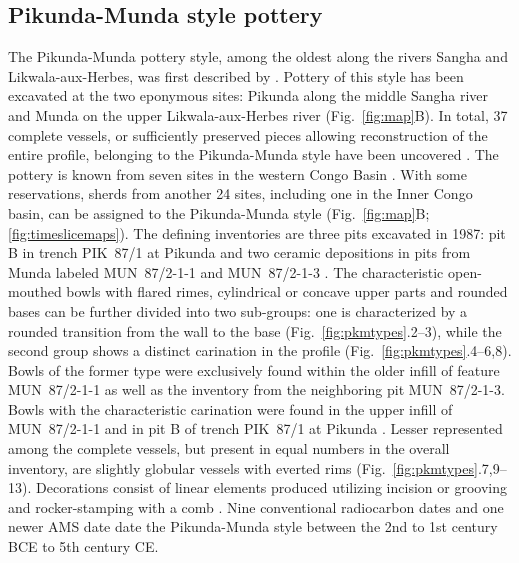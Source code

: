 \documentclass[smallextended,natbib]{svjour3}       %
\begin{document}
\subsection{Pikunda-Munda style pottery}

The Pikunda-Munda pottery style, among the oldest along the rivers Sangha and Likwala-aux-Herbes, was first described by \citet{Eggert.1992}. Pottery of this style has been excavated at the two eponymous sites: Pikunda along the middle Sangha river and Munda on the upper Likwala-aux-Herbes river (Fig.~\ref{fig:map}B). In total, 37 complete vessels, or sufficiently preserved pieces allowing reconstruction of the entire profile, belonging to the Pikunda-Munda style have been uncovered \citep[114--115]{Seidensticker.2021e}. The pottery is known from seven sites in the western Congo Basin \citep[119--120 Fig.~49]{Seidensticker.2021e}. With some reservations, sherds from another 24 sites, including one in the Inner Congo basin, can be assigned to the Pikunda-Munda style (Fig.~\ref{fig:map}B; \ref{fig:timeslicemaps}). The defining inventories are three pits excavated in 1987: pit B in trench PIK~87/1 at Pikunda \citep[288--300]{Seidensticker.2021e} and two ceramic depositions in pits from Munda labeled MUN~87/2-1-1 and MUN~87/2-1-3 \citep[321--335]{Seidensticker.2021e}. The characteristic open-mouthed bowls with flared rimes, cylindrical or concave upper parts and rounded bases \citep[311-314]{Eggert.1993} can be further divided into two sub-groups: one is characterized by a rounded transition from the wall to the base (Fig.~\ref{fig:pkmtypes}.2--3), while the second group shows a distinct carination in the profile (Fig.~\ref{fig:pkmtypes}.4--6,8). Bowls of the former type were exclusively found within the older infill of feature MUN~87/2-1-1 as well as the inventory from the neighboring pit MUN~87/2-1-3. Bowls with the characteristic carination were found in the upper infill of MUN~87/2-1-1 and in pit B of trench PIK~87/1 at Pikunda \citep[115--117]{Seidensticker.2021e}. Lesser represented among the complete vessels, but present in equal numbers in the overall inventory, are slightly globular vessels with everted rims (Fig.~\ref{fig:pkmtypes}.7,9--13). Decorations consist of linear elements produced utilizing incision or grooving and rocker-stamping with a comb \citep[362 App.~4.12]{Seidensticker.2021e}. Nine conventional radiocarbon dates \citep[117 Fig.~48, 355--356 App.~2]{Seidensticker.2021e} and one newer AMS date \citep[Tab.~2: RICH-30864]{Seidensticker.2024} date the Pikunda-Munda style between the 2nd to 1st century BCE to 5th century CE.
\end{document}
